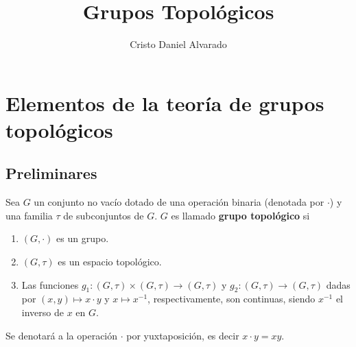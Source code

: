 \documentclass[12pt]{report}
\theoremstyle{largebreak}
\newcommand{\cf}[3]{\ensuremath{#1:#2\rightarrow#3}}
\begin{document}
    \title{Grupos Topológicos}
    \author{Cristo Daniel Alvarado}
    \maketitle

    \tableofcontents %

    
    \chapter{Elementos de la teoría de grupos topológicos}
    
    \section{Preliminares}

    \begin{mydef}
        Sea $G$ un conjunto no vacío dotado de una operación binaria (denotada por $\cdot$) y una familia $\tau$ de subconjuntos de $G$. $G$ es llamado \textbf{grupo topológico} si
        \begin{enumerate}
            \item $(G,\cdot)$ es un grupo.
            \item $(G,\tau)$ es un espacio topológico.
            \item Las funciones $\cf{g_1}{(G,\tau)\times (G,\tau)}{(G,\tau)}$ y $\cf{g_2}{(G,\tau)}{(G,\tau)}$ dadas por $(x,y)\mapsto x\cdot y$ y $x\mapsto x^{-1}$, respectivamente, son continuas, siendo $x^{-1}$ el inverso de $x$ en $G$.
        \end{enumerate}
    \end{mydef}

    Se denotará a la operación $\cdot$ por yuxtaposición, es decir $x\cdot y = xy$.
\end{document}
